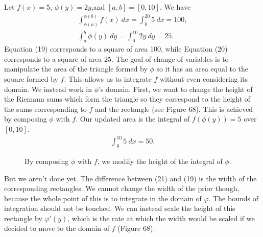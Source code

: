 \documentclass{article}
\theoremstyle{definition}
\begin{document}
	Let $ f(x)=5 $, $ \phi(y)=2y $,and $ [a,b]=[0,10] $. We have 
	\begin{align}
		\int_{\phi(a)}^{\phi(b)}f(x)\ dx=\int_{0}^{20}5\ dx=100,\\\int_{a}^{b}\phi(y)\ dy=\int_{0}^{10}2y \ dy=25.
	\end{align}
	Equation (19) corresponds to a square of area 100, while Equation (20) corresponds to a square of area 25. The goal of change of variables is to manipulate the area of the triangle formed by $ \phi $ so it has an area equal to the square formed by $ f $. This allows us to integrate $ f $ without even considering its domain. We instead work in $ \phi $'s domain. First, we want to change the height of the Riemann sums which form the triangle so they correspond to the height of the sums corresponding to $ f $ and the rectangle (see Figure 68). This is achieved by composing $ \phi $ with $ f $. Our updated area is the integral of $ f(\phi(y))=5 $ over  $ [0,10] $. 
	\begin{align}
		\int_{0}^{10}5\ dx=50.
	\end{align}
	\begin{figure}[h!]
		\centering
		\caption{By composing $ \phi $ with $ f $, we modify the height of the integral of $ \phi $.}
	\end{figure}
	But we aren't done yet. The difference between (21) and (19) is the width of the corresponding rectangles. We cannot change the width of the prior though, because the whole point of this is to integrate in the domain of $ \varphi $. The bounds of integration should not be touched. We can instead scale the height of this rectangle by $ \varphi'(y) $, which is the rate at which the width would be scaled if we decided to move to the domain of $ f $ (Figure 68). 
\end{document}
